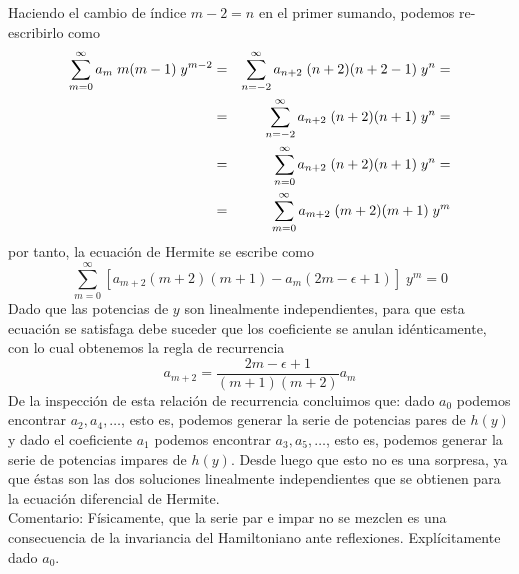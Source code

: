 Haciendo el cambio de índice $m - 2 = n$ en el primer sumando, podemos re-escribirlo como
\begin{eqnarray*}
\sum_{m=0}^{\infty} a_{m} \; m(m-1) \; y^{m-2} &=& \sum_{n=-2}^{\infty} a_{n+2} \; (n + 2)(n + 2 - 1) \; y^{n} = \nonumber \\
&=& \sum_{n=-2}^{\infty} a_{n + 2} \; (n + 2)(n + 1) \; y^{n} = \nonumber \\ 
&=& \sum_{n = 0}^{\infty} a_{n + 2} \; (n + 2)(n + 1) \; y^{n} = \nonumber \\
&=& \sum_{m = 0}^{\infty} a_{m + 2} \; (m + 2)(m + 1) \; y^{m}
\end{eqnarray*}
por tanto, la ecuación de Hermite se escribe como
\begin{equation}
\sum_{m = 0}^{\infty} \left[ a_{m + 2} (m + 2)(m + 1) - a_{m} (2 m - \epsilon + 1) \right] \; y^{m} = 0
\label{eq:ecuacion_06_14} 
\end{equation}
Dado que las potencias de $y$ son linealmente independientes, para que esta ecuación se satisfaga debe suceder que los coeficiente se anulan idénticamente, con lo cual obtenemos la regla de recurrencia
\begin{equation}
a_{m + 2} = \dfrac{2m - \epsilon + 1}{(m + 1)(m + 2)} a_{m}
\label{eq:ecuacion_06_15}
\end{equation}
De la inspección de esta relación de recurrencia concluimos que: dado $a_{0}$ podemos encontrar $a_{2}, a_{4}, \ldots $, esto es, podemos generar la serie de potencias pares de $h(y)$ y dado el coeficiente $a_{1}$ podemos encontrar $a_{3}, a_{5}, \ldots $, esto es, podemos generar la serie de potencias impares de $h(y)$. Desde luego que esto no es una sorpresa, ya que éstas son las dos soluciones linealmente independientes que se obtienen para la ecuación diferencial de Hermite.
\\
Comentario: Físicamente, que la serie par e impar no se mezclen es una consecuencia de la invariancia del Hamiltoniano ante reflexiones. Explícitamente dado $a_{0}$.






